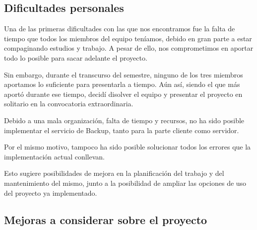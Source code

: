 \subsection{Dificultades personales}
Una de las primeras dificultades con las que nos encontramos fue la falta de tiempo que todos los miembros del equipo teníamos, debido en gran parte a estar compaginando estudios y trabajo. A pesar de ello, nos comprometimos en aportar todo lo posible para sacar adelante el proyecto.

Sin embargo, durante el transcurso del semestre, ninguno de los tres miembros aportamos lo suficiente para presentarla a tiempo. Aún así, siendo el que más aportó durante ese tiempo, decidí disolver el equipo y presentar el proyecto en solitario en la convocatoria extraordinaria.

Debido a una mala organización, falta de tiempo y recursos, no ha sido posible implementar el servicio de Backup, tanto para la parte cliente como servidor. 

Por el mismo motivo, tampoco ha sido posible solucionar todos los errores que la implementación actual conllevan.

Esto sugiere posibilidades de mejora en la planificación del trabajo y del mantenimiento del mismo, junto a la posibilidad de ampliar las opciones de uso del proyecto ya implementado.

\subsection{Mejoras a considerar sobre el proyecto}
